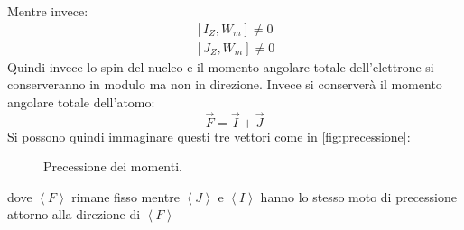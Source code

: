 Mentre invece:
\begin{equation}\begin{split}
\left [ I_Z, W_m \right ] \ne 0\\
\left [ J_Z, W_m \right ] \ne 0
\end{split}\end{equation}
Quindi invece lo spin del nucleo e il momento angolare totale dell'elettrone si conserveranno in modulo ma non in direzione. Invece si conserverà il momento angolare totale dell'atomo:
\begin{equation}
\vec{F} = \vec{I} + \vec{J}
\end{equation}
Si possono quindi immaginare questi tre vettori come in
\autoref{fig:precessione}:
\begin{figure}[hbtp]
\centering
\caption{Precessione dei momenti.}
\label{fig:precessione}

\end{figure}
dove $\left \langle F \right \rangle$ rimane fisso mentre $\left \langle J
\right \rangle$ e $\left \langle I \right \rangle$ hanno lo stesso moto di
precessione attorno alla direzione di $\left \langle F \right \rangle$

